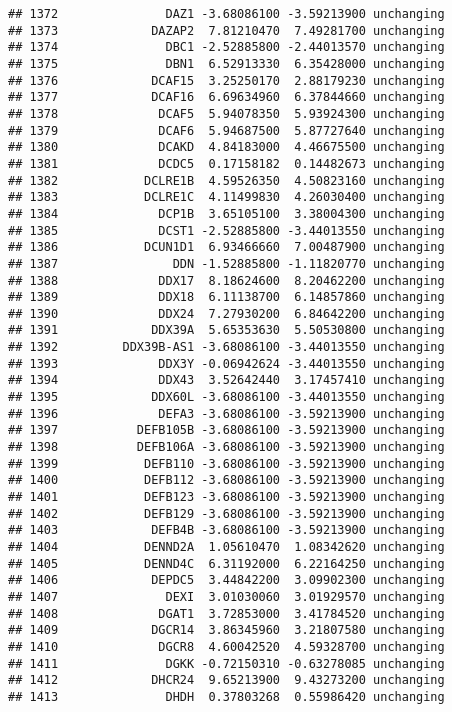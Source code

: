 \documentclass[]{article}
\begin{document}
\begin{verbatim}
## 1372               DAZ1 -3.68086100 -3.59213900 unchanging
## 1373             DAZAP2  7.81210470  7.49281700 unchanging
## 1374               DBC1 -2.52885800 -2.44013570 unchanging
## 1375               DBN1  6.52913330  6.35428000 unchanging
## 1376             DCAF15  3.25250170  2.88179230 unchanging
## 1377             DCAF16  6.69634960  6.37844660 unchanging
## 1378              DCAF5  5.94078350  5.93924300 unchanging
## 1379              DCAF6  5.94687500  5.87727640 unchanging
## 1380              DCAKD  4.84183000  4.46675500 unchanging
## 1381              DCDC5  0.17158182  0.14482673 unchanging
## 1382            DCLRE1B  4.59526350  4.50823160 unchanging
## 1383            DCLRE1C  4.11499830  4.26030400 unchanging
## 1384              DCP1B  3.65105100  3.38004300 unchanging
## 1385              DCST1 -2.52885800 -3.44013550 unchanging
## 1386            DCUN1D1  6.93466660  7.00487900 unchanging
## 1387                DDN -1.52885800 -1.11820770 unchanging
## 1388              DDX17  8.18624600  8.20462200 unchanging
## 1389              DDX18  6.11138700  6.14857860 unchanging
## 1390              DDX24  7.27930200  6.84642200 unchanging
## 1391             DDX39A  5.65353630  5.50530800 unchanging
## 1392         DDX39B-AS1 -3.68086100 -3.44013550 unchanging
## 1393              DDX3Y -0.06942624 -3.44013550 unchanging
## 1394              DDX43  3.52642440  3.17457410 unchanging
## 1395             DDX60L -3.68086100 -3.44013550 unchanging
## 1396              DEFA3 -3.68086100 -3.59213900 unchanging
## 1397           DEFB105B -3.68086100 -3.59213900 unchanging
## 1398           DEFB106A -3.68086100 -3.59213900 unchanging
## 1399            DEFB110 -3.68086100 -3.59213900 unchanging
## 1400            DEFB112 -3.68086100 -3.59213900 unchanging
## 1401            DEFB123 -3.68086100 -3.59213900 unchanging
## 1402            DEFB129 -3.68086100 -3.59213900 unchanging
## 1403             DEFB4B -3.68086100 -3.59213900 unchanging
## 1404            DENND2A  1.05610470  1.08342620 unchanging
## 1405            DENND4C  6.31192000  6.22164250 unchanging
## 1406             DEPDC5  3.44842200  3.09902300 unchanging
## 1407               DEXI  3.01030060  3.01929570 unchanging
## 1408              DGAT1  3.72853000  3.41784520 unchanging
## 1409             DGCR14  3.86345960  3.21807580 unchanging
## 1410              DGCR8  4.60042520  4.59328700 unchanging
## 1411               DGKK -0.72150310 -0.63278085 unchanging
## 1412             DHCR24  9.65213900  9.43273200 unchanging
## 1413               DHDH  0.37803268  0.55986420 unchanging

\end{verbatim}
\end{document}
